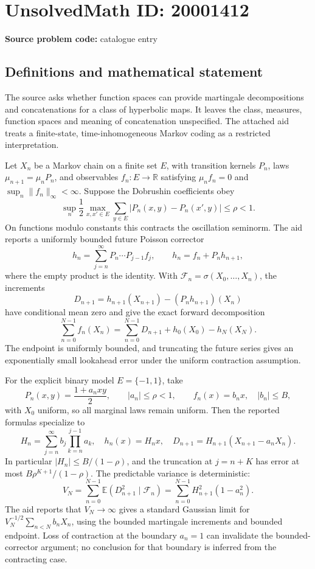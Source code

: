 \documentclass[11pt]{article}
\newcommand{\R}{\mathbb{R}}
\newcommand{\E}{\mathbb{E}}
\begin{document}
\section*{UnsolvedMath ID: 20001412}
\textbf{Source problem code:} catalogue entry
\subsection{Definitions and mathematical statement}
The source asks whether function spaces can provide martingale decompositions and concatenations for a class of hyperbolic maps. It leaves the class, measures, function spaces and meaning of concatenation unspecified. The attached aid treats a finite-state, time-inhomogeneous Markov coding as a restricted interpretation.

Let \(X_n\) be a Markov chain on a finite set \(E\), with transition kernels \(P_n\), laws \(\mu_{n+1}=\mu_nP_n\), and observables \(f_n:E\to\R\) satisfying \(\mu_nf_n=0\) and \(\sup_n\|f_n\|_\infty<\infty\). Suppose the Dobrushin coefficients obey
\[
 \sup_n\frac12\max_{x,x'\in E}\sum_{y\in E}|P_n(x,y)-P_n(x',y)|\le\rho<1.
\]
On functions modulo constants this contracts the oscillation seminorm. The aid reports a uniformly bounded future Poisson corrector
\[
 h_n=\sum_{j=n}^{\infty}P_n\cdots P_{j-1}f_j,
 \qquad h_n=f_n+P_nh_{n+1},
\]
where the empty product is the identity. With \(\mathcal F_n=\sigma(X_0,\ldots,X_n)\), the increments
\[
 D_{n+1}=h_{n+1}(X_{n+1})-(P_nh_{n+1})(X_n)
\]
have conditional mean zero and give the exact forward decomposition
\[
 \sum_{n=0}^{N-1}f_n(X_n)
 =\sum_{n=0}^{N-1}D_{n+1}+h_0(X_0)-h_N(X_N).
\]
The endpoint is uniformly bounded, and truncating the future series gives an exponentially small lookahead error under the uniform contraction assumption.

For the explicit binary model \(E=\{-1,1\}\), take
\[
 P_n(x,y)=\frac{1+a_nxy}{2},\qquad |a_n|\le\rho<1,\qquad f_n(x)=b_nx,\quad |b_n|\le B,
\]
with \(X_0\) uniform, so all marginal laws remain uniform. Then the reported formulas specialize to
\[
 H_n=\sum_{j=n}^{\infty}b_j\prod_{k=n}^{j-1}a_k,\quad
 h_n(x)=H_nx,\quad
 D_{n+1}=H_{n+1}(X_{n+1}-a_nX_n).
\]
In particular \(|H_n|\le B/(1-\rho)\), and the truncation at \(j=n+K\) has error at most \(B\rho^{K+1}/(1-\rho)\). The predictable variance is deterministic:
\[
 V_N=\sum_{n=0}^{N-1}\E(D_{n+1}^2\mid\mathcal F_n)
     =\sum_{n=0}^{N-1}H_{n+1}^2(1-a_n^2).
\]
The aid reports that \(V_N\to\infty\) gives a standard Gaussian limit for \(V_N^{-1/2}\sum_{n<N}b_nX_n\), using the bounded martingale increments and bounded endpoint. Loss of contraction at the boundary \(a_n=1\) can invalidate the bounded-corrector argument; no conclusion for that boundary is inferred from the contracting case.
\end{document}
